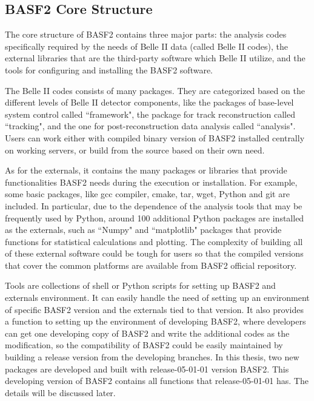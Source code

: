 \subsection{BASF2 Core Structure}
The core structure of BASF2 contains three major parts: the analysis codes specifically required by the needs of Belle II data (called Belle II codes), the external libraries that are the third-party software which Belle II utilize, and the tools for configuring and installing the BASF2 software. 

The Belle II codes consists of many packages. They are categorized based on the different levels of Belle II detector components, like the packages of base-level system control called ``framework", the package for track reconstruction called ``tracking", and the one for post-reconstruction data analysis called ``analysis".
Users can work either with compiled binary version of BASF2 installed centrally on working servers, or build from the source based on their own need. 

As for the externals, it contains the many packages or libraries that provide functionalities BASF2 needs during the execution or installation. For example, some basic packages, like gcc compiler, cmake, tar, wget, Python and git are included. In particular, due to the dependence of the analysis tools that may be frequently used by Python, around 100 additional Python packages are installed as the externals, such as ``Numpy" and ``matplotlib" packages that provide functions for statistical calculations and plotting. The complexity of building all of these external software could be tough for users so that the compiled versions that cover the common platforms are available from BASF2 official repository. 

Tools are collections of shell or Python scripts for setting up BASF2 and externals environment. It can easily handle the need of setting up an environment of specific BASF2 version and the externals tied to that version. It also provides a function to setting up the environment of developing BASF2, where developers can get one developing copy of BASF2 and write the additional codes as the modification, so the compatibility of BASF2 could be easily maintained by building a release version from the developing branches. In this thesis, two new packages are developed and built with release-05-01-01 version BASF2. This developing version of BASF2 contains all functions that release-05-01-01 has. The details will be discussed later. 

